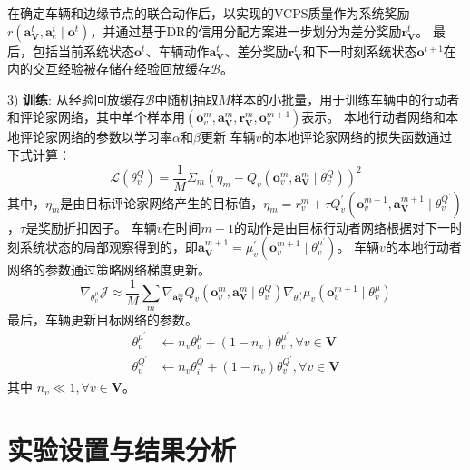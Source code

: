 在确定车辆和边缘节点的联合动作后，以实现的VCPS质量作为系统奖励$r\left(\boldsymbol{a}_{\mathbf{V}}^{t},\boldsymbol{a}_{e}^{t} \mid \boldsymbol{o}^{t}\right)$，并通过基于DR的信用分配方案进一步划分为差分奖励$\boldsymbol{r}_{\mathbf{V}}^{t}$。
最后，包括当前系统状态$\boldsymbol{o}^{t}$、车辆动作$\boldsymbol{a}_{\mathbf{V}}^{t}$、差分奖励$\boldsymbol{r}_{\mathbf{V}}^{t}$和下一时刻系统状态$\boldsymbol{o}^{t+1}$在内的交互经验被存储在经验回放缓存$\mathcal{B}$。

3) \textbf{训练}: 从经验回放缓存$\mathcal{B}$中随机抽取$M$样本的小批量，用于训练车辆中的行动者和评论家网络，其中单个样本用$(\boldsymbol{o}_{v}^{m}, \boldsymbol{a}_{\mathbf{V}}^{m}, \boldsymbol{r}_{\mathbf{V}}^{m}, \boldsymbol{o}_{v}^{m+1})$表示。
本地行动者网络和本地评论家网络的参数以学习率$\alpha$和$\beta$更新
车辆$v$的本地评论家网络的损失函数通过下式计算：
\begin{equation}
	\mathcal{L}\left(\theta_{v}^{Q}\right)=\frac{1}{M} \Sigma_{m}\left(\eta_{m}-Q_{v}\left(\boldsymbol{o}_{v}^{m}, \boldsymbol{a}_{\mathbf{V}}^{m} \mid \theta_{v}^{Q}\right)\right)^{2}
\end{equation}
\noindent 其中，$\eta_{m}$是由目标评论家网络产生的目标值，$\eta_{m}=r_{v}^{m}+\tau Q_{v}^{\prime}(\boldsymbol{o}_{v}^{m+1}, \boldsymbol{a}_{\mathbf{V}}^{m+1} \mid \theta_{v}^{Q^{\prime}})$，$\tau$是奖励折扣因子。
车辆$v$在时间$m+1$的动作是由目标行动者网络根据对下一时刻系统状态的局部观察得到的，即$\boldsymbol{a}_{\mathbf{V}}^{m+1}=\mu_{v}^{\prime}(\boldsymbol{o}_{v}^{m+1} \mid \theta_{v}^{\mu^{\prime}})$。
车辆$v$的本地行动者网络的参数通过策略网络梯度更新。
\begin{equation}
	\nabla_{\theta_{v}^{\mu}} \mathcal{J} \approx \frac{1}{M} \sum_{m} \nabla_{\boldsymbol{a}_{\mathbf{V}}^{m}} Q_{v}\left(\boldsymbol{o}_{v}^{m}, \boldsymbol{a}_{\mathbf{V}}^{m} \mid \theta_{v}^{Q}\right) \nabla_{\theta_{v}^{\mu}} \mu_{v}\left(\boldsymbol{o}_{v}^{m+1} \mid \theta_{v}^{\mu}\right)
\end{equation}
最后，车辆更新目标网络的参数。
\begin{align}
	\theta_{v}^{\mu^{\prime}} &\leftarrow n_{v} \theta_{v}^{\mu}+(1-n_{v})  \theta_{v}^{\mu^{\prime}}, \forall v \in \mathbf{V}\\
	\theta_{v}^{Q^{\prime}} &\leftarrow n_{v} \theta_{i}^{Q}+(1-n_{v})  \theta_{v}^{Q^{\prime}}, \forall v \in \mathbf{V}
\end{align}
\noindent 其中 $n_{v} \ll 1, \forall v \in \mathbf{V} $。

\section{实验设置与结果分析}\label{section 2-6}


